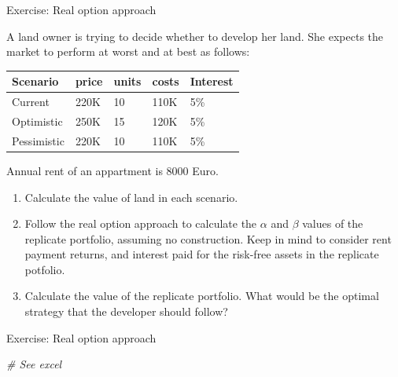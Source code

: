 \documentclass[ignorenonframetext,]{beamer}
\newenvironment{Shaded}{\begin{snugshade}}{\end{snugshade}}
\newcommand{\CommentTok}[1]{\textcolor[rgb]{0.56,0.35,0.01}{\textit{{#1}}}}
\providecommand{\tightlist}{%
\setlength{\itemsep}{0pt}\setlength{\parskip}{0pt}}
\begin{document}
\begin{frame}{Exercise: Real option approach}

\small

A land owner is trying to decide whether to develop her land. She
expects the market to perform at worst and at best as follows:

\begin{longtable}[]{@{}lllll@{}}
\toprule
Scenario & price & units & costs & Interest\tabularnewline
\midrule
\endhead
Current & 220K & 10 & 110K & 5\%\tabularnewline
Optimistic & 250K & 15 & 120K & 5\%\tabularnewline
Pessimistic & 220K & 10 & 110K & 5\%\tabularnewline
\bottomrule
\end{longtable}

Annual rent of an appartment is 8000 Euro.

\begin{enumerate}
\def\labelenumi{\arabic{enumi}.}
\tightlist
\item
  Calculate the value of land in each scenario.
\item
  Follow the real option approach to calculate the \(\alpha\) and
  \(\beta\) values of the replicate portfolio, assuming no construction.
  Keep in mind to consider rent payment returns, and interest paid for
  the risk-free assets in the replicate potfolio.
\item
  Calculate the value of the replicate portfolio. What would be the
  optimal strategy that the developer should follow?
\end{enumerate}

\normalsize

\end{frame}

\begin{frame}[fragile]{Exercise: Real option approach}

\begin{Shaded}
\begin{Highlighting}[]
\CommentTok{# See excel}
\end{Highlighting}
\end{Shaded}

\end{frame}
\end{document}
